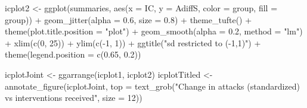 \documentclass[
  10pt,
  dvipsnames, enabledeprecatedfontcommands]{scrartcl}
\newenvironment{Shaded}{\begin{snugshade}}{\end{snugshade}}
\newcommand{\AttributeTok}[1]{\textcolor[rgb]{0.77,0.63,0.00}{#1}}
\newcommand{\DecValTok}[1]{\textcolor[rgb]{0.00,0.00,0.81}{#1}}
\newcommand{\FloatTok}[1]{\textcolor[rgb]{0.00,0.00,0.81}{#1}}
\newcommand{\FunctionTok}[1]{\textcolor[rgb]{0.00,0.00,0.00}{#1}}
\newcommand{\NormalTok}[1]{#1}
\newcommand{\OtherTok}[1]{\textcolor[rgb]{0.56,0.35,0.01}{#1}}
\newcommand{\SpecialCharTok}[1]{\textcolor[rgb]{0.00,0.00,0.00}{#1}}
\newcommand{\StringTok}[1]{\textcolor[rgb]{0.31,0.60,0.02}{#1}}
\begin{document}
\begin{Shaded}
\begin{Highlighting}[]
\NormalTok{icplot2 }\OtherTok{\textless{}{-}} \FunctionTok{ggplot}\NormalTok{(summaries, }\FunctionTok{aes}\NormalTok{(}\AttributeTok{x =}\NormalTok{ IC, }\AttributeTok{y =}\NormalTok{ AdiffS, }\AttributeTok{color =}\NormalTok{ group, }\AttributeTok{fill =}\NormalTok{ group)) }\SpecialCharTok{+}
    \FunctionTok{geom\_jitter}\NormalTok{(}\AttributeTok{alpha =} \FloatTok{0.6}\NormalTok{, }\AttributeTok{size =} \FloatTok{0.8}\NormalTok{) }\SpecialCharTok{+} \FunctionTok{theme\_tufte}\NormalTok{() }\SpecialCharTok{+} \FunctionTok{theme}\NormalTok{(}\AttributeTok{plot.title.position =} \StringTok{"plot"}\NormalTok{) }\SpecialCharTok{+}
    \FunctionTok{geom\_smooth}\NormalTok{(}\AttributeTok{alpha =} \FloatTok{0.2}\NormalTok{, }\AttributeTok{method =} \StringTok{"lm"}\NormalTok{) }\SpecialCharTok{+} \FunctionTok{xlim}\NormalTok{(}\FunctionTok{c}\NormalTok{(}\DecValTok{0}\NormalTok{, }\DecValTok{25}\NormalTok{)) }\SpecialCharTok{+} \FunctionTok{ylim}\NormalTok{(}\FunctionTok{c}\NormalTok{(}\SpecialCharTok{{-}}\DecValTok{1}\NormalTok{,}
    \DecValTok{1}\NormalTok{)) }\SpecialCharTok{+} \FunctionTok{ggtitle}\NormalTok{(}\StringTok{"sd restricted to ({-}1,1)"}\NormalTok{) }\SpecialCharTok{+} \FunctionTok{theme}\NormalTok{(}\AttributeTok{legend.position =} \FunctionTok{c}\NormalTok{(}\FloatTok{0.65}\NormalTok{,}
    \FloatTok{0.2}\NormalTok{))}


\NormalTok{icplotJoint }\OtherTok{\textless{}{-}} \FunctionTok{ggarrange}\NormalTok{(icplot1, icplot2)}
\NormalTok{icplotTitled }\OtherTok{\textless{}{-}} \FunctionTok{annotate\_figure}\NormalTok{(icplotJoint, }\AttributeTok{top =} \FunctionTok{text\_grob}\NormalTok{(}\StringTok{"Change in attacks (standardized) vs interventions received"}\NormalTok{,}
    \AttributeTok{size =} \DecValTok{12}\NormalTok{))}
\end{Highlighting}
\end{Shaded}

\normalsize
\end{document}
